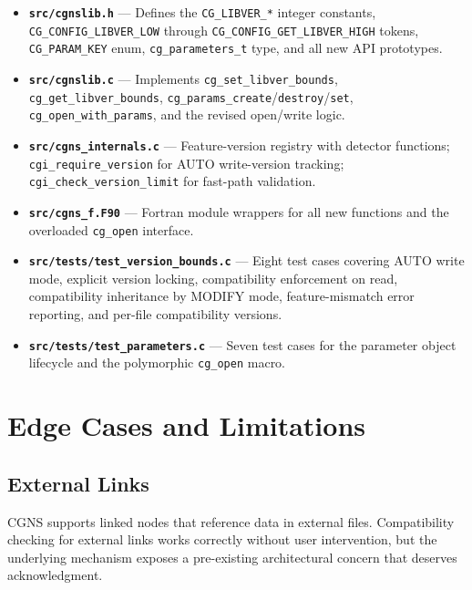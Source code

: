 \documentclass[11pt,letterpaper]{article}
\begin{document}
\begin{itemize}[leftmargin=2em]
\item \textbf{\texttt{src/cgnslib.h}} --- Defines the
  \texttt{CG\_LIBVER\_*} integer constants,
  \texttt{CG\_CONFIG\_LIBVER\_LOW} through
  \texttt{CG\_CONFIG\_GET\_LIBVER\_HIGH} tokens,
  \texttt{CG\_PARAM\_KEY} enum, \texttt{cg\_parameters\_t} type,
  and all new API prototypes.
\item \textbf{\texttt{src/cgnslib.c}} --- Implements
  \texttt{cg\_set\_libver\_bounds},
  \texttt{cg\_get\_libver\_bounds},
  \texttt{cg\_params\_create}/\texttt{destroy}/\texttt{set},
  \texttt{cg\_open\_with\_params}, and the revised open/write logic.
\item \textbf{\texttt{src/cgns\_internals.c}} --- Feature-version
  registry with detector functions; \texttt{cgi\_require\_version}
  for AUTO write-version tracking;
  \texttt{cgi\_check\_version\_limit} for fast-path validation.
\item \textbf{\texttt{src/cgns\_f.F90}} --- Fortran module wrappers
  for all new functions and the overloaded \texttt{cg\_open}
  interface.
\item \textbf{\texttt{src/tests/test\_version\_bounds.c}} ---
  Eight test cases covering AUTO write mode, explicit version
  locking, compatibility enforcement on read, compatibility
  inheritance by MODIFY mode, feature-mismatch error reporting,
  and per-file compatibility versions.
\item \textbf{\texttt{src/tests/test\_parameters.c}} ---
  Seven test cases for the parameter object lifecycle and the
  polymorphic \texttt{cg\_open} macro.
\end{itemize}

\section{Edge Cases and Limitations}

\subsection{External Links}

CGNS supports linked nodes that reference data in external files.
Compatibility checking for external links works correctly without
user intervention, but the underlying mechanism exposes a
pre-existing architectural concern that deserves acknowledgment.
\end{document}
